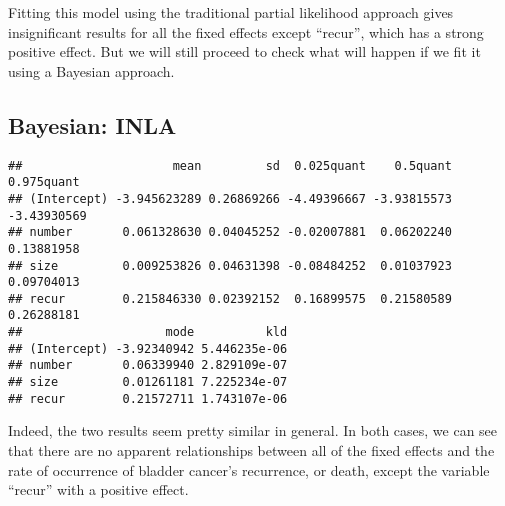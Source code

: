 \documentclass[]{article}
\newenvironment{Shaded}{\begin{snugshade}}{\end{snugshade}}
\newcommand{\DataTypeTok}[1]{\textcolor[rgb]{0.13,0.29,0.53}{#1}}
\newcommand{\DecValTok}[1]{\textcolor[rgb]{0.00,0.00,0.81}{#1}}
\newcommand{\KeywordTok}[1]{\textcolor[rgb]{0.13,0.29,0.53}{\textbf{#1}}}
\newcommand{\NormalTok}[1]{#1}
\newcommand{\OperatorTok}[1]{\textcolor[rgb]{0.81,0.36,0.00}{\textbf{#1}}}
\newcommand{\OtherTok}[1]{\textcolor[rgb]{0.56,0.35,0.01}{#1}}
\newcommand{\StringTok}[1]{\textcolor[rgb]{0.31,0.60,0.02}{#1}}
\begin{document}
Fitting this model using the traditional partial likelihood approach
gives insignificant results for all the fixed effects except ``recur'',
which has a strong positive effect. But we will still proceed to check
what will happen if we fit it using a Bayesian approach.

\hypertarget{bayesian-inla-1}{%
\subsection{Bayesian: INLA}\label{bayesian-inla-1}}

\begin{Shaded}
\end{Shaded}

\begin{verbatim}
##                     mean         sd  0.025quant    0.5quant  0.975quant
## (Intercept) -3.945623289 0.26869266 -4.49396667 -3.93815573 -3.43930569
## number       0.061328630 0.04045252 -0.02007881  0.06202240  0.13881958
## size         0.009253826 0.04631398 -0.08484252  0.01037923  0.09704013
## recur        0.215846330 0.02392152  0.16899575  0.21580589  0.26288181
##                    mode          kld
## (Intercept) -3.92340942 5.446235e-06
## number       0.06339940 2.829109e-07
## size         0.01261181 7.225234e-07
## recur        0.21572711 1.743107e-06
\end{verbatim}

Indeed, the two results seem pretty similar in general. In both cases,
we can see that there are no apparent relationships between all of the
fixed effects and the rate of occurrence of bladder cancer's recurrence,
or death, except the variable ``recur'' with a positive effect.
\end{document}
